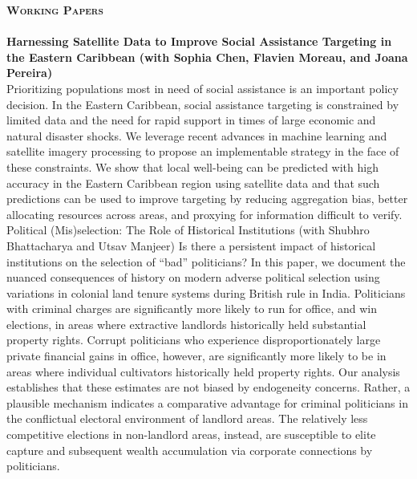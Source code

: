\documentclass[11pt]{article}
\newcommand{\lineunder}{\vspace*{-8pt} \\ \hspace*{-18pt} \hrulefill \\}
\newcommand{\header}[1]{{\hspace*{-15pt}\vspace*{6pt} \textsc{#1}} \vspace*{-6pt} \lineunder}
\newcommand{\schoolwithcourses}[4]{
 \textbf{#1} \hfill{#2}\\
    #3\\
\vspace*{5pt}
}
\begin{document}
\vspace{1mm}

\header{\textbf{Working Papers}}

\schoolwithcourses{Harnessing Satellite Data to Improve Social Assistance Targeting in the Eastern Caribbean \textnormal{(with Sophia Chen, Flavien Moreau, and Joana Pereira)}}{}{\vspace{2mm} Prioritizing populations most in need of social assistance is an important policy decision. In the Eastern Caribbean, social assistance targeting is constrained by limited data and the need for rapid support in times of large economic and natural disaster shocks. We leverage recent advances in machine learning and satellite imagery processing to propose an implementable strategy in the face of these constraints. We show that local well-being can be predicted with high accuracy in the Eastern Caribbean region using satellite data and that such predictions can be used to improve targeting by reducing aggregation bias, better allocating resources across areas, and proxying for information difficult to verify. \vspace{2mm}}

\schoolwithcourses{Political (Mis)selection: The Role of Historical Institutions \textnormal{(with Shubhro Bhattacharya and Utsav Manjeer)}}{}{\vspace{2mm} Is there a persistent impact of historical institutions on the selection of ``bad'' politicians? In this paper, we document the nuanced consequences of history on modern adverse political selection using variations in colonial land tenure systems during British rule in India. Politicians with criminal charges are significantly more likely to run for office, and win elections, in areas where extractive landlords historically held substantial property rights. Corrupt politicians who experience disproportionately large private financial gains in office, however, are significantly more likely to be in areas where individual cultivators historically held property rights. Our analysis establishes that these estimates are not biased by endogeneity concerns. Rather, a plausible mechanism indicates a comparative advantage for criminal politicians in the conflictual electoral environment of landlord areas. The relatively less competitive elections in non-landlord areas, instead, are susceptible to elite capture and subsequent wealth accumulation via corporate connections by politicians.}  

\vspace{1mm}
\end{document}
